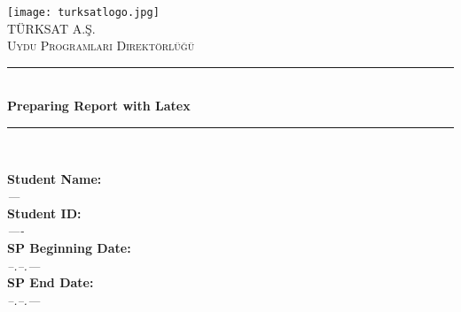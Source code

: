 \begin{titlepage}

\newcommand{\HRule}{\rule{\linewidth}{0.5mm}} %

\center %

\texttt{[image: turksatlogo.jpg]}\\[1cm]
 

 

\textsc{\LARGE TÜRKSAT A.Ş.}\\[1.5cm] %
\textsc{\Large Uydu Programları Direktörlüğü}\\[0.5cm] %


\HRule \\[0.4cm]

{ \huge \bfseries \large  Preparing Report with Latex}\\[0cm] %
\HRule \\[1cm]
 

\begin{minipage}{0.35\textwidth}
\begin{flushleft} \large
\textbf{Student Name:} \\
 \textit{---} \\
\textbf{Student ID:} \\ 
 \textit{----} \\
\textbf{SP Beginning Date:} \\
 \textit{--.--.---} \\
\textbf{SP End Date:}\\
 \textit{--.--.---}



\end{flushleft}
\end{minipage}
\end{titlepage}
